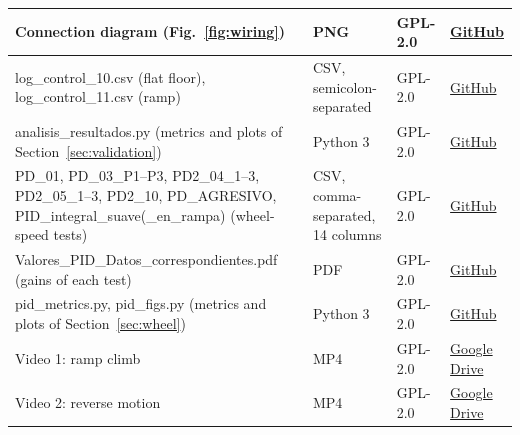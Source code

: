 \documentclass[11pt,letterpaper]{article}
\begin{document}
\begin{table}[H]
\begin{tabularx}{\textwidth}{|L{0.33\textwidth}|L{0.16\textwidth}|L{0.12\textwidth}|Y|}
Connection diagram (Fig.~\ref{fig:wiring}) & PNG & GPL-2.0 & \href{https://github.com/alexsv315-lang/Vision-Based-Mobile-Ball-and-Plate-System}{GitHub} \\ \hline
log\_control\_10.csv (flat floor), log\_control\_11.csv (ramp) & CSV, semicolon-separated & GPL-2.0 & \href{https://github.com/alexsv315-lang/Vision-Based-Mobile-Ball-and-Plate-System}{GitHub} \\ \hline
analisis\_resultados.py (metrics and plots of Section~\ref{sec:validation}) & Python 3 & GPL-2.0 & \href{https://github.com/alexsv315-lang/Vision-Based-Mobile-Ball-and-Plate-System}{GitHub} \\ \hline
PD\_01, PD\_03\_P1--P3, PD2\_04\_1--3, PD2\_05\_1--3, PD2\_10, PD\_AGRESIVO, PID\_integral\_suave(\_en\_rampa) (wheel-speed tests) & CSV, comma-separated, 14 columns & GPL-2.0 & \href{https://github.com/alexsv315-lang/Vision-Based-Mobile-Ball-and-Plate-System}{GitHub} \\ \hline
Valores\_PID\_Datos\_\allowbreak correspondientes.pdf (gains of each test) & PDF & GPL-2.0 & \href{https://github.com/alexsv315-lang/Vision-Based-Mobile-Ball-and-Plate-System}{GitHub} \\ \hline
pid\_metrics.py, pid\_figs.py (metrics and plots of Section~\ref{sec:wheel}) & Python 3 & GPL-2.0 & \href{https://github.com/alexsv315-lang/Vision-Based-Mobile-Ball-and-Plate-System}{GitHub} \\ \hline
Video 1: ramp climb & MP4 & GPL-2.0 & \href{https://drive.google.com/file/d/12MyZ74ZD0Io3IhAB6Xtw1eezuV8RvqDj/view?usp=sharing}{Google Drive} \\ \hline
Video 2: reverse motion & MP4 & GPL-2.0 & \href{https://drive.google.com/file/d/1ND7cfqTfeYYMZg7W4a4FlZ_xd6O5o8VT/view?usp=sharing}{Google Drive} \\ \hline
\end{tabularx}
\end{table}
\end{document}
